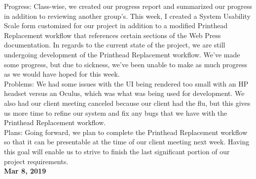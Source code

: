 Progress: 	Class-wise, we created our progress report and summarized our progress in addition to reviewing another group's. This week, I created a System Usability Scale form customized for our project in addition to a modified Printhead Replacement workflow that references certain sections of the Web Press documentation. In regards to the current state of the project, we are still undergoing development of the Printhead Replacement workflow. We've made some progress, but due to sickness, we've been unable to make as much progress as we would have hoped for this week. \\
Problems: 	We had some issues with the UI being rendered too small with an HP headset versus an Oculus, which was what was being used for development. We also had our client meeting canceled because our client had the flu, but this gives us more time to refine our system and fix any bugs that we have with the Printhead Replacement workflow. \\
Plans: 	Going forward, we plan to complete the Printhead Replacement workflow so that it can be presentable at the time of our client meeting next week. Having this goal will enable us to strive to finish the last significant portion of our project requirements. 
\\
\textbf{Mar 8, 2019}\\

